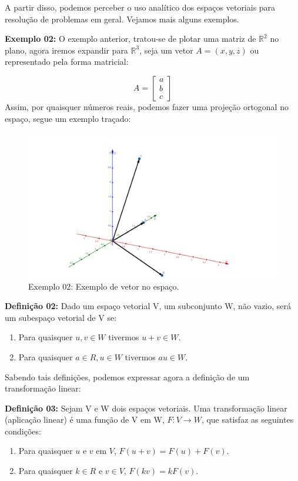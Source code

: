 A partir disso, podemos perceber o uso analítico dos espaços vetoriais para resolução de problemas em geral. Vejamos mais alguns exemplos.

\noindent\textbf{Exemplo 02:} O exemplo anterior, tratou-se de plotar uma matriz de $\mathbb{R}^2$ no plano, agora iremos expandir para $\mathbb{R}^3$, seja um vetor $A = (x, y, z)$ ou representado pela forma matricial:

\[
A = \begin{bmatrix}
	a \\ b \\ c
\end{bmatrix}
\]
\noindent Assim, por quaisquer números reais, podemos fazer uma projeção ortogonal no espaço, segue um exemplo traçado:

\begin{figure}[H]
	\centering
	\includegraphics[scale=0.30]{exemplo02.png}
	\caption{Exemplo 02: Exemplo de vetor no espaço.}
\end{figure}

\noindent\textbf{Definição 02:} Dado um espaço vetorial V, um subconjunto W, não vazio, será um subespaço vetorial de V se:
\begin{enumerate}
	\item Para quaisquer $u, v \in W$ tivermos $u + v \in W$.
	\item Para quaisquer $a \in R, u \in W$ tivermos $au \in W$.
	\end{enumerate}


Sabendo tais definições, podemos expressar agora a definição de um transformação linear:

\noindent\textbf{Definição 03:} Sejam V e W dois espaços vetoriais. Uma transformação linear (aplicação linear) é uma função de V em W, $F:V \rightarrow W$, que satisfaz as seguintes condições:
\begin{enumerate}
	\item Para quaisquer $u$ e $v$ em $V$, $F(u + v) = F(u) + F(v)$.
	\item Para quaisquer $k \in R$ e $v \in V$, $F(kv) = kF(v)$.
\end{enumerate}	

